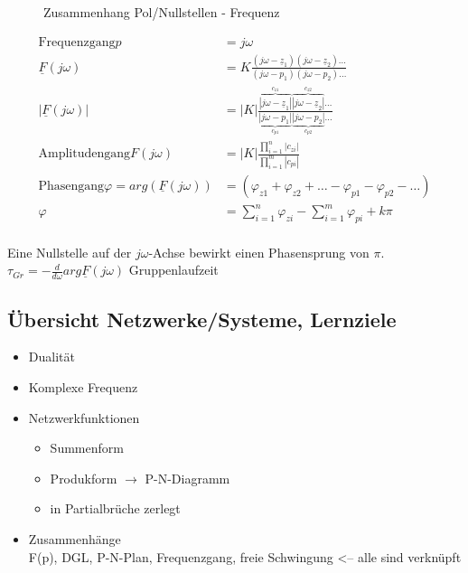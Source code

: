 \begin{figure}[!ht]
\begin{center}
  
  \caption{Zusammenhang Pol/Nullstellen - Frequenz}
  \label{fig:elNetzw:PNFrequenz}
\end{center}
\end{figure}

\begin{align}
	\text{Frequenzgang} p&=j\omega\nonumber\\
	\underline{F}(j\omega)&=K\frac{(j\omega-\underline{z}_1)(j\omega-\underline{z}_2)\ldots}{(j\omega-p_1)(j\omega-p_2)\ldots}\nonumber\\
	|\underline{F}(j\omega)|&=|K|\frac{\overbrace{|j\omega-\underline{z}_1|}^{c_{z1}}\overbrace{|j\omega-\underline{z}_2|}^{c_{z2}}\ldots}{\underbrace{|j\omega-p_1|}_{c_{p1}}\underbrace{|j\omega-p_2|}_{c_{p2}}\ldots}\nonumber\\
	\text{Amplitudengang}F(j\omega)&=|K|\frac{\prod_{i=1}^{n}|c_{zi}|}{\prod_{i=1}^{m}|c_{pi}|} \nonumber\\
	\text{Phasengang}\varphi =
arg\left(\underline{F}(j\omega)\right)&=\left(\varphi_{z1}+\varphi_{z2}+\ldots-\varphi_{p1}-\varphi_{p2}-\ldots\right)\nonumber\\
	\varphi &= \sum_{i=1}^n\varphi_{zi}-\sum_{i=1}^m\varphi_{pi}+k\pi\nonumber
\end{align}\\
Eine Nullstelle auf der $j\omega$-Achse bewirkt einen Phasensprung von $\pi$.\\
$\tau_{Gr}=-\frac{d}{d\omega}arg\underline{F}(j\omega)$ Gruppenlaufzeit\\
\subsection{Übersicht Netzwerke/Systeme, Lernziele}
\begin{itemize}
  \item Dualität
  \item Komplexe Frequenz
  \item Netzwerkfunktionen
  \begin{itemize}
    \item Summenform
    \item Produkform $\rightarrow$ P-N-Diagramm
    \item in Partialbrüche zerlegt
	\end{itemize}
	\item Zusammenhänge\\
	F(p), DGL, P-N-Plan, Frequenzgang, freie Schwingung <-- alle sind verknüpft
\end{itemize}	